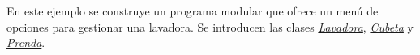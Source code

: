 En este ejemplo se construye un programa modular que ofrece un menú de opciones para gestionar una lavadora. Se introducen las clases {\itshape \hyperlink{class_lavadora}{Lavadora}}, {\itshape \hyperlink{class_cubeta}{Cubeta}} y {\itshape \hyperlink{class_prenda}{Prenda}}. 